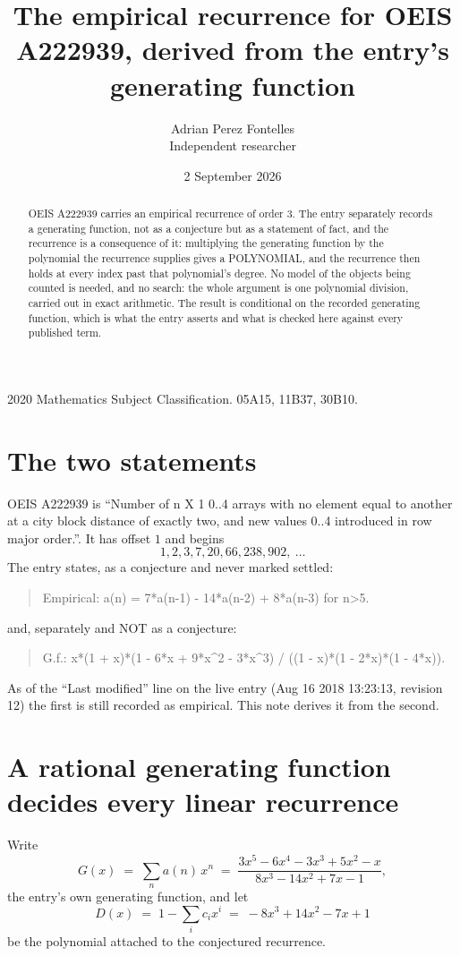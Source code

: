 \documentclass[11pt,a4paper]{article}
\title{The empirical recurrence for OEIS A222939, derived from the entry's generating function}
\author{Adrian Perez Fontelles\\ \small Independent researcher}
\date{2 September 2026}
\theoremstyle{plain}
\theoremstyle{definition}
\begin{document}
\maketitle

\begin{abstract}
OEIS A222939 carries an empirical recurrence of order $3$. The entry separately records a
generating function, not as a conjecture but as a statement of fact, and the recurrence is a
consequence of it: multiplying the generating function by the polynomial the recurrence
supplies gives a POLYNOMIAL, and the recurrence then holds at every index past that
polynomial's degree. No model of the objects being counted is needed, and no search: the
whole argument is one polynomial division, carried out in exact arithmetic. The result is
conditional on the recorded generating function, which is what the entry asserts and what is
checked here against every published term.
\end{abstract}

\noindent\small 2020 Mathematics Subject Classification. 05A15, 11B37, 30B10.\normalsize

\section{The two statements}

OEIS A222939 is ``Number of n X 1 0..4 arrays with no element equal to another at a city block distance of exactly two, and new values 0..4 introduced in row major order.''. It has offset $1$ and begins
\[
1, 2, 3, 7, 20, 66, 238, 902,\ \dots
\]
The entry states, as a conjecture and never marked settled:
\begin{quote}
Empirical: a(n) = 7*a(n-1) - 14*a(n-2) + 8*a(n-3) for n>5.
\end{quote}
and, separately and NOT as a conjecture:
\begin{quote}
G.f.: x*(1 + x)*(1 - 6*x + 9*x\^{}2 - 3*x\^{}3) / ((1 - x)*(1 - 2*x)*(1 - 4*x)).
\end{quote}
As of the ``Last modified'' line on the live entry (Aug 16 2018 13:23:13, revision 12) the first is still
recorded as empirical. This note derives it from the second.

\section{A rational generating function decides every linear recurrence}

Write
\[
G(x)\;=\;\sum_{n}a(n)\,x^{n}\;=\;\frac{3 x^{5} - 6 x^{4} - 3 x^{3} + 5 x^{2} - x}{8 x^{3} - 14 x^{2} + 7 x - 1},
\]
the entry's own generating function, and let
\[
D(x)\;=\;1-\sum_i c_i x^{i}\;=\;- 8 x^{3} + 14 x^{2} - 7 x + 1
\]
be the polynomial attached to the conjectured recurrence.
\end{document}
